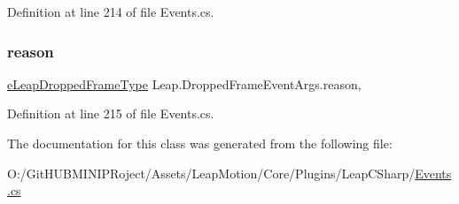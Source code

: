 Definition at line 214 of file Events.\+cs.

\mbox{\label{class_leap_1_1_dropped_frame_event_args_a4c5452cab63ac4cb05be737edb54f5e6}} 
\subsubsection{\texorpdfstring{reason}{reason}}
{\footnotesize\ttfamily \mbox{\hyperlink{namespace_leap_internal_af32f98bc0f7257d572aa3f3c3dac43a3}{e\+Leap\+Dropped\+Frame\+Type}} Leap.\+Dropped\+Frame\+Event\+Args.\+reason\hspace{0.3cm}{\ttfamily [get]}, {\ttfamily [set]}}



Definition at line 215 of file Events.\+cs.



The documentation for this class was generated from the following file\+:\begin{DoxyCompactItemize}
\item 
O\+:/\+Git\+H\+U\+B\+M\+I\+N\+I\+P\+Roject/\+Assets/\+Leap\+Motion/\+Core/\+Plugins/\+Leap\+C\+Sharp/\mbox{\hyperlink{_events_8cs}{Events.\+cs}}\end{DoxyCompactItemize}
